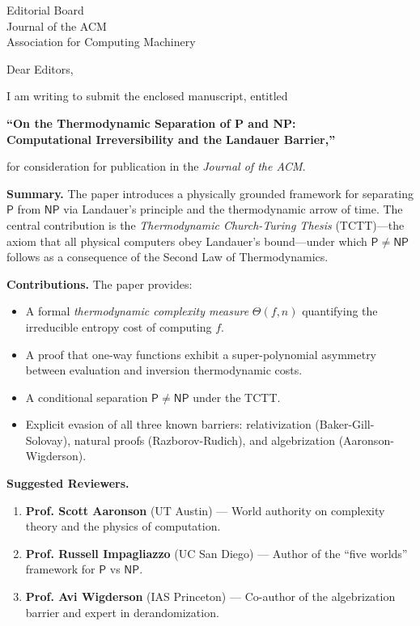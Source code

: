 \documentclass[12pt, a4paper]{letter}
\begin{document}
\begin{letter}{Editorial Board \\ Journal of the ACM \\ Association for Computing Machinery}

\opening{Dear Editors,}

I am writing to submit the enclosed manuscript, entitled

\begin{center}
\textbf{``On the Thermodynamic Separation of P and NP: \\
Computational Irreversibility and the Landauer Barrier,''}
\end{center}

\noindent for consideration for publication in the \textit{Journal of the ACM}.

\medskip

\textbf{Summary.} The paper introduces a physically grounded framework for
separating $\mathsf{P}$ from $\mathsf{NP}$ via Landauer's principle and the
thermodynamic arrow of time. The central contribution is the \emph{Thermodynamic
Church-Turing Thesis} (TCTT)---the axiom that all physical computers obey
Landauer's bound---under which $\mathsf{P} \neq \mathsf{NP}$ follows as a
consequence of the Second Law of Thermodynamics.

\medskip

\textbf{Contributions.} The paper provides:
\begin{itemize}
  \item A formal \emph{thermodynamic complexity measure} $\Theta(f,n)$
    quantifying the irreducible entropy cost of computing $f$.
  \item A proof that one-way functions exhibit a super-polynomial asymmetry
    between evaluation and inversion thermodynamic costs.
  \item A conditional separation $\mathsf{P} \neq \mathsf{NP}$ under the TCTT.
  \item Explicit evasion of all three known barriers: relativization
    (Baker-Gill-Solovay), natural proofs (Razborov-Rudich), and algebrization
    (Aaronson-Wigderson).
\end{itemize}

\medskip

\textbf{Suggested Reviewers.}
\begin{enumerate}
  \item \textbf{Prof. Scott Aaronson} (UT Austin) --- World authority on
    complexity theory and the physics of computation.
  \item \textbf{Prof. Russell Impagliazzo} (UC San Diego) --- Author of the
    ``five worlds'' framework for $\mathsf{P}$ vs $\mathsf{NP}$.
  \item \textbf{Prof. Avi Wigderson} (IAS Princeton) --- Co-author of the
    algebrization barrier and expert in derandomization.
\end{enumerate}


\end{letter}
\end{document}
